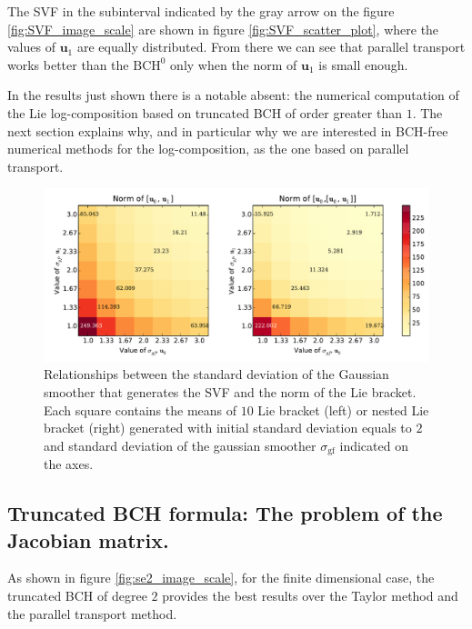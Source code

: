 The SVF in the subinterval indicated by the gray arrow on the figure \ref{fig:SVF_image_scale} are shown in figure \ref{fig:SVF_scatter_plot}, where the values of $\mathbf{u}_1$ are equally distributed. From there we can see that parallel transport works better than the $\text{BCH}^0$ only when the norm of $\mathbf{u}_1$ is small enough.

In the results just shown there is a notable absent: the numerical computation of the Lie log-composition based on truncated BCH of order greater than $1$. The next section explains why, and in particular why we are interested in BCH-free numerical methods for the log-composition, as the one based on parallel transport.

\begin{figure}[!ht]
	\hspace{0cm}
	\includegraphics[scale=0.5]{figures/SVF_image_scale_bracket_versus_gaussian.pdf}
	\caption{Relationships between the standard deviation of the Gaussian smoother that generates the SVF and the norm of the Lie bracket. Each square contains the means of $10$ Lie bracket (left) or nested Lie bracket (right) generated with initial standard deviation equals to $2$ and standard deviation of the gaussian smoother $\sigma_{\text{gf}}$ indicated on the axes.}
	\label{fig:SVF_image_scale_bracket_versus_gaussian}
\end{figure}

\subsection{Truncated BCH formula: The problem of the Jacobian matrix.}\label{se:jacobian_problem}

As shown in figure \ref{fig:se2_image_scale}, for the finite dimensional case, the truncated BCH of degree $2$ provides the best results over the Taylor method and the parallel transport method.

